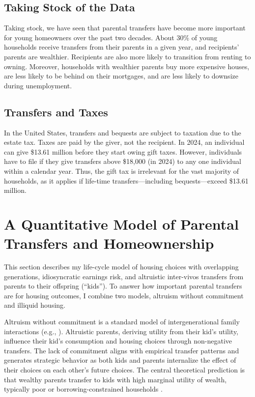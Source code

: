 \documentclass[12pt]{article}
\begin{document}
\subsection{Taking Stock of the Data}
Taking stock, we have seen that parental transfers have become more important for young homeowners over the past two decades. About 30\% of young households receive transfers from their parents in a given year, and recipients' parents are wealthier. Recipients are also more likely to transition from renting to owning. Moreover, households with wealthier parents buy more expensive houses, are less likely to be behind on their mortgages, and are less likely to downsize during unemployment. 

\subsection{Transfers and Taxes}
In the United States, transfers and bequests are subject to taxation due to the estate tax. Taxes are paid by the giver, not the recipient. In 2024, an individual can give \$13.61 million before they start owing gift taxes. However, individuals have to file if they give transfers above \$18,000 (in 2024) to any one individual within a calendar year. Thus, the gift tax is irrelevant for the vast majority of households, as it applies if life-time  transfers---including bequests---exceed \$13.61 million.


\section{A Quantitative Model of Parental Transfers and Homeownership}\label{sec:model}
This section describes my life-cycle model of housing choices with overlapping generations, idiosyncratic earnings risk, and altruistic inter-vivos transfers from parents to their offspring (``kids''). To answer how important parental transfers are for housing outcomes, I combine two models, altruism without commitment and illiquid housing. 

Altruism without commitment is a standard model of intergenerational family interactions (e.g., \cite{Altonji1997a,Barczyk2018}). Altruistic parents, deriving utility from their kid's utility, influence their kid's consumption and housing choices through non-negative transfers. The lack of commitment aligns with empirical transfer patterns and generates strategic behavior as both kids and parents internalize the effect of their choices on each other's future choices. The central theoretical prediction is that wealthy parents transfer to kids with high marginal utility of wealth, typically poor or borrowing-constrained households \citep{Chu2020,Barczyk2020}.
\end{document}

